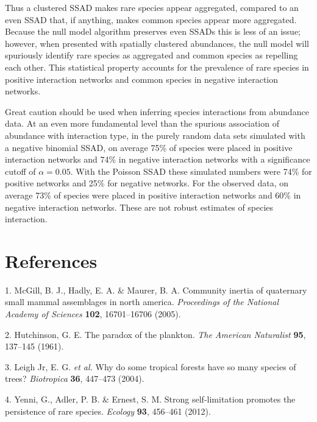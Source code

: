 \documentclass[]{article}
\begin{document}
Thus a clustered SSAD makes rare species appear aggregated, compared to
an even SSAD that, if anything, makes common species appear more
aggregated. Because the null model algorithm preserves even SSADs this
is less of an issue; however, when presented with spatially clustered
abundances, the null model will spuriously identify rare species as
aggregated and common species as repelling each other. This statistical
property accounts for the prevalence of rare species in positive
interaction networks and common species in negative interaction
networks.

Great caution should be used when inferring species interactions from
abundance data. At an even more fundamental level than the spurious
association of abundance with interaction type, in the purely random
data sets simulated with a negative binomial SSAD, on average 75\% of
species were placed in positive interaction networks and 74\% in
negative interaction networks with a significance cutoff of
\(\alpha = 0.05\). With the Poisson SSAD these simulated numbers were
74\% for positive networks and 25\% for negative networks. For the
observed data, on average 73\% of species were placed in positive
interaction networks and 60\% in negative interaction networks. These
are not robust estimates of species interaction.

\clearpage

\section*{References}\label{references}

\hypertarget{refs}{}
\hypertarget{ref-mcgill2005}{}
1. McGill, B. J., Hadly, E. A. \& Maurer, B. A. Community inertia of
quaternary small mammal assemblages in north america. \emph{Proceedings
of the National Academy of Sciences} \textbf{102}, 16701--16706 (2005).

\hypertarget{ref-hutchinson1961}{}
2. Hutchinson, G. E. The paradox of the plankton. \emph{The American
Naturalist} \textbf{95}, 137--145 (1961).

\hypertarget{ref-leigh2004}{}
3. Leigh Jr, E. G. \emph{et al.} Why do some tropical forests have so
many species of trees? \emph{Biotropica} \textbf{36}, 447--473 (2004).

\hypertarget{ref-yenni2012}{}
4. Yenni, G., Adler, P. B. \& Ernest, S. M. Strong self-limitation
promotes the persistence of rare species. \emph{Ecology} \textbf{93},
456--461 (2012).
\end{document}
